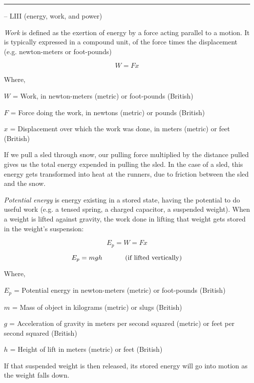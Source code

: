 \filbreak \vskip 5pt \hrule \vskip 5pt  -- LIII (energy, work, and power) \vskip 10pt

{\it Work} is defined as the exertion of energy by a force acting parallel to a motion.  It is typically expressed in a compound unit, of the force times the displacement (e.g. newton-meters or foot-pounds)

$$W = Fx$$

\noindent
Where,

$W$ = Work, in newton-meters (metric) or foot-pounds (British)

$F$ = Force doing the work, in newtons (metric) or pounds (British)

$x$ = Displacement over which the work was done, in meters (metric) or feet (British)

\vskip 10pt

If we pull a sled through snow, our pulling force multiplied by the distance pulled gives us the total energy expended in pulling the sled.  In the case of a sled, this energy gets transformed into heat at the runners, due to friction between the sled and the snow.

\vskip 10pt

{\it Potential energy} is energy existing in a stored state, having the potential to do useful work (e.g. a tensed spring, a charged capacitor, a suspended weight).  When a weight is lifted against gravity, the work done in lifting that weight gets stored in the weight's suspension:
 
$$E_p = W = Fx$$

$$E_p = mgh \hbox{ \hskip 30pt (if lifted vertically)}$$

\noindent
Where,

$E_p$ = Potential energy in newton-meters (metric) or foot-pounds (British)

$m$ = Mass of object in kilograms (metric) or slugs (British)

$g$ = Acceleration of gravity in meters per second squared (metric) or feet per second squared (British)

$h$ = Height of lift in meters (metric) or feet (British)

\vskip 10pt

If that suspended weight is then released, its stored energy will go into motion as the weight falls down.

\vskip 10pt


